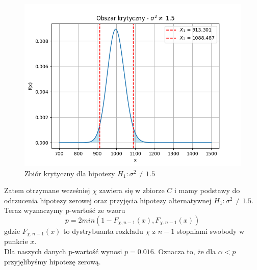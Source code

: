 \documentclass{article}
\begin{document}
\begin{figure}[H]
    \centering
    \includegraphics[scale=0.5]{sig_neq.png}
    \caption{Zbiór krytyczny dla hipotezy $H_{1}:\sigma^{2}\neq1.5$}
    \label{fig:4}
\end{figure}
Zatem otrzymane wcześniej $\chi$ zawiera się w zbiorze $C$ i mamy podstawy do odrzucenia hipotezy zerowej oraz przyjęcia hipotezy alternatywnej $H_{1}:\sigma^{2}\neq1.5$.\\
Teraz wyznaczymy p-wartość ze wzoru
\begin{equation}
    p = 2min(1-F_{\chi,n-1}(x), F_{\chi,n-1}(x))
\end{equation}
gdzie $F_{\chi,n-1}(x)$ to dystrybuanta rozkładu $\chi$ z $n-1$ stopniami swobody w punkcie $x$.\\
Dla naszych danych p-wartość wynosi $p=0.016$. Oznacza to, że dla $\alpha<p$ przyjęlibyśmy hipotezę zerową.
\end{document}
